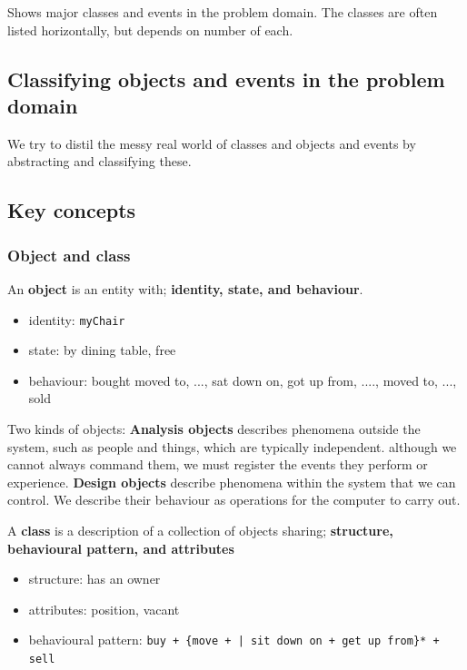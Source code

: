 Shows major classes and events in the problem domain. The classes are often listed horizontally, but depends on number of each.

\subsection{Classifying objects and events in the problem domain}
We try to distil the messy real world of classes and objects and events by abstracting and classifying these. 

\subsection{Key concepts}

\subsubsection{Object and class}
An \textbf{object} is an entity with; \textbf{identity, state, and behaviour}. 

\begin{itemize}
    \item[] identity: \texttt{myChair}
    \item[] state: by dining table, free
    \item[] behaviour: bought moved to, ..., sat down on, got up from, ...., moved to, ..., sold
\end{itemize}

\noindent Two kinds of objects: 
\textbf{Analysis objects} describes phenomena outside the system, such as people and things, which are typically independent. although we cannot always command them, we must register the events they perform or experience. \textbf{Design objects} describe phenomena within the system that we can control. We describe their behaviour as operations for the computer to carry out.

\bigskip
\noindent A \textbf{class} is a description of a collection of objects sharing; \textbf{structure, behavioural pattern, and attributes}

\begin{itemize}
    \item[] structure: has an owner
    \item[] attributes: position, vacant
    \item[] behavioural pattern: \texttt{buy + \{move + | sit down on + get up from\}* + sell}
\end{itemize}

